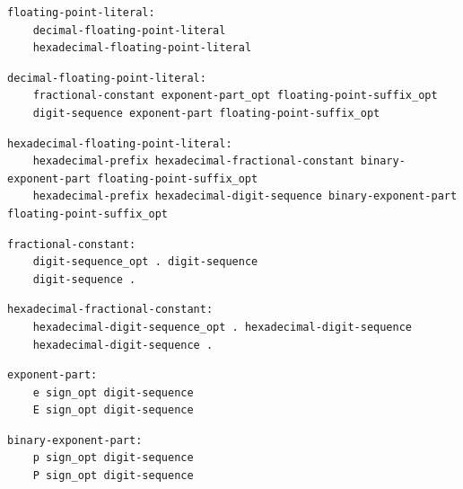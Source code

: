 \noindent\textbf{\texttt{}}\par
\begin{lstlisting}
floating-point-literal:
    decimal-floating-point-literal
    hexadecimal-floating-point-literal
\end{lstlisting}

\noindent\textbf{\texttt{}}\par
\begin{lstlisting}
decimal-floating-point-literal:
    fractional-constant exponent-part_opt floating-point-suffix_opt
    digit-sequence exponent-part floating-point-suffix_opt
\end{lstlisting}

\noindent\textbf{\texttt{}}\par
\begin{lstlisting}
hexadecimal-floating-point-literal:
    hexadecimal-prefix hexadecimal-fractional-constant binary-exponent-part floating-point-suffix_opt
    hexadecimal-prefix hexadecimal-digit-sequence binary-exponent-part floating-point-suffix_opt
\end{lstlisting}

\noindent\textbf{\texttt{}}\par
\begin{lstlisting}
fractional-constant:
    digit-sequence_opt . digit-sequence
    digit-sequence .
\end{lstlisting}

\noindent\textbf{\texttt{}}\par
\begin{lstlisting}
hexadecimal-fractional-constant:
    hexadecimal-digit-sequence_opt . hexadecimal-digit-sequence
    hexadecimal-digit-sequence .
\end{lstlisting}

\noindent\textbf{\texttt{}}\par
\begin{lstlisting}
exponent-part:
    e sign_opt digit-sequence
    E sign_opt digit-sequence
\end{lstlisting}

\noindent\textbf{\texttt{}}\par
\begin{lstlisting}
binary-exponent-part:
    p sign_opt digit-sequence
    P sign_opt digit-sequence
\end{lstlisting}

